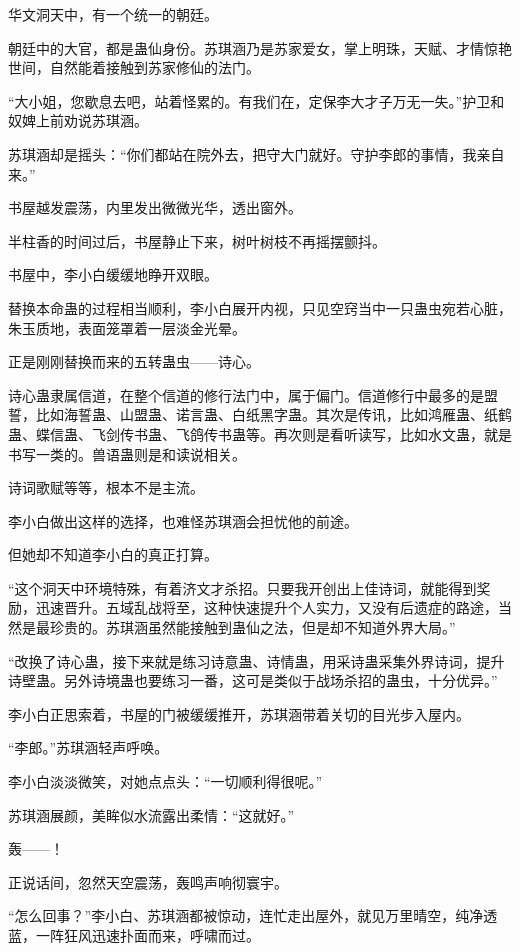 \begin{this_body}
华文洞天中，有一个统一的朝廷。

朝廷中的大官，都是蛊仙身份。苏琪涵乃是苏家爱女，掌上明珠，天赋、才情惊艳世间，自然能着接触到苏家修仙的法门。

“大小姐，您歇息去吧，站着怪累的。有我们在，定保李大才子万无一失。”护卫和奴婢上前劝说苏琪涵。

苏琪涵却是摇头：“你们都站在院外去，把守大门就好。守护李郎的事情，我亲自来。”

书屋越发震荡，内里发出微微光华，透出窗外。

半柱香的时间过后，书屋静止下来，树叶树枝不再摇摆颤抖。

书屋中，李小白缓缓地睁开双眼。

替换本命蛊的过程相当顺利，李小白展开内视，只见空窍当中一只蛊虫宛若心脏，朱玉质地，表面笼罩着一层淡金光晕。

正是刚刚替换而来的五转蛊虫——诗心。

诗心蛊隶属信道，在整个信道的修行法门中，属于偏门。信道修行中最多的是盟誓，比如海誓蛊、山盟蛊、诺言蛊、白纸黑字蛊。其次是传讯，比如鸿雁蛊、纸鹤蛊、蝶信蛊、飞剑传书蛊、飞鸽传书蛊等。再次则是看听读写，比如水文蛊，就是书写一类的。兽语蛊则是和读说相关。

诗词歌赋等等，根本不是主流。

李小白做出这样的选择，也难怪苏琪涵会担忧他的前途。

但她却不知道李小白的真正打算。

“这个洞天中环境特殊，有着济文才杀招。只要我开创出上佳诗词，就能得到奖励，迅速晋升。五域乱战将至，这种快速提升个人实力，又没有后遗症的路途，当然是最珍贵的。苏琪涵虽然能接触到蛊仙之法，但是却不知道外界大局。”

“改换了诗心蛊，接下来就是练习诗意蛊、诗情蛊，用采诗蛊采集外界诗词，提升诗壁蛊。另外诗境蛊也要练习一番，这可是类似于战场杀招的蛊虫，十分优异。”

李小白正思索着，书屋的门被缓缓推开，苏琪涵带着关切的目光步入屋内。

“李郎。”苏琪涵轻声呼唤。

李小白淡淡微笑，对她点点头：“一切顺利得很呢。”

苏琪涵展颜，美眸似水流露出柔情：“这就好。”

轰——！

正说话间，忽然天空震荡，轰鸣声响彻寰宇。

“怎么回事？”李小白、苏琪涵都被惊动，连忙走出屋外，就见万里晴空，纯净透蓝，一阵狂风迅速扑面而来，呼啸而过。


\end{this_body}
